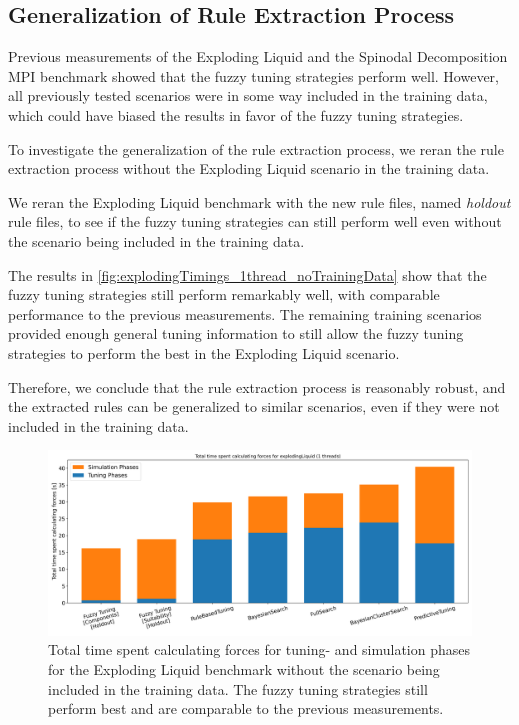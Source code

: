 \newpage

\subsection{Generalization of Rule Extraction Process}

Previous measurements of the Exploding Liquid and the Spinodal Decomposition MPI benchmark showed that the fuzzy tuning strategies perform well. However, all previously tested scenarios were in some way included in the training data, which could have biased the results in favor of the fuzzy tuning strategies.

To investigate the generalization of the rule extraction process, we reran the rule extraction process without the Exploding Liquid scenario in the training data.

We reran the Exploding Liquid benchmark with the new rule files, named \emph{holdout} rule files, to see if the fuzzy tuning strategies can still perform well even without the scenario being included in the training data.

The results in \autoref{fig:explodingTimings_1thread_noTrainingData} show that the fuzzy tuning strategies still perform remarkably well, with comparable performance to the previous measurements. The remaining training scenarios provided enough general tuning information to still allow the fuzzy tuning strategies to perform the best in the Exploding Liquid scenario.

Therefore, we conclude that the rule extraction process is reasonably robust, and the extracted rules can be generalized to similar scenarios, even if they were not included in the training data.

\begin{figure}[H]
    \centering
    \includegraphics[width=\columnwidth,trim={0cm 0 0cm 0.9cm},clip]{figures/Benchmark/ExplodingLiquidHoldout/total_time_explodingLiquid_1.png}
    \caption[
        Benchmark Results for the Exploding Liquid Scenario (Holdout)
    ]{
        Total time spent calculating forces for tuning- and simulation phases for the Exploding Liquid benchmark without the scenario being included in the training data. The fuzzy tuning strategies still perform best and are comparable to the previous measurements.
    }
    \label{fig:explodingTimings_1thread_noTrainingData}
\end{figure}